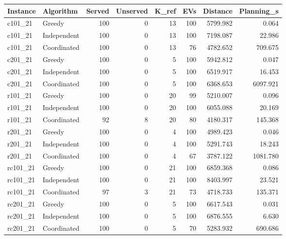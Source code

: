 \begin{tabular}{llrrrrrr}
\toprule
Instance & Algorithm & Served & Unserved & K\_ref & EVs & Distance & Planning\_s \\
\midrule
c101\_21 & Greedy & 100 & 0 & 13 & 100 & 5799.982 & 0.064 \\
c101\_21 & Independent & 100 & 0 & 13 & 100 & 7198.087 & 22.986 \\
c101\_21 & Coordinated & 100 & 0 & 13 & 76 & 4782.652 & 709.675 \\
c201\_21 & Greedy & 100 & 0 & 5 & 100 & 5942.812 & 0.047 \\
c201\_21 & Independent & 100 & 0 & 5 & 100 & 6519.917 & 16.453 \\
c201\_21 & Coordinated & 100 & 0 & 5 & 100 & 6368.653 & 6097.921 \\
r101\_21 & Greedy & 100 & 0 & 20 & 99 & 5210.007 & 0.096 \\
r101\_21 & Independent & 100 & 0 & 20 & 100 & 6055.088 & 20.169 \\
r101\_21 & Coordinated & 92 & 8 & 20 & 80 & 4180.317 & 145.368 \\
r201\_21 & Greedy & 100 & 0 & 4 & 100 & 4989.423 & 0.046 \\
r201\_21 & Independent & 100 & 0 & 4 & 100 & 5291.743 & 18.243 \\
r201\_21 & Coordinated & 100 & 0 & 4 & 67 & 3787.122 & 1081.780 \\
rc101\_21 & Greedy & 100 & 0 & 21 & 100 & 6859.368 & 0.086 \\
rc101\_21 & Independent & 100 & 0 & 21 & 100 & 8403.997 & 23.521 \\
rc101\_21 & Coordinated & 97 & 3 & 21 & 73 & 4718.733 & 135.371 \\
rc201\_21 & Greedy & 100 & 0 & 5 & 100 & 6617.543 & 0.031 \\
rc201\_21 & Independent & 100 & 0 & 5 & 100 & 6876.555 & 6.630 \\
rc201\_21 & Coordinated & 100 & 0 & 5 & 70 & 5283.932 & 690.686 \\
\bottomrule
\end{tabular}
